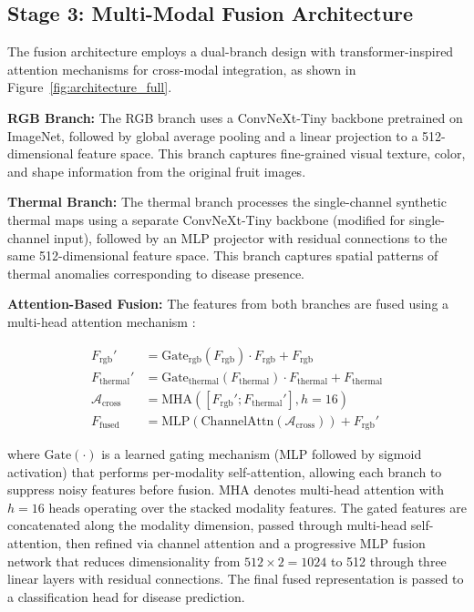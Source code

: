 \documentclass[utf8]{FrontiersinHarvard}
\newenvironment{revblock}{}{}
\begin{document}
\subsection{Stage 3: Multi-Modal Fusion Architecture}
\begin{revblock}
The fusion architecture employs a dual-branch design with transformer-inspired attention mechanisms for cross-modal integration, as shown in Figure~\ref{fig:architecture_full}.

\textbf{RGB Branch:} The RGB branch uses a ConvNeXt-Tiny \cite{liu2022convnext} backbone pretrained on ImageNet, followed by global average pooling and a linear projection to a 512-dimensional feature space. This branch captures fine-grained visual texture, color, and shape information from the original fruit images.

\textbf{Thermal Branch:} The thermal branch processes the single-channel synthetic thermal maps using a separate ConvNeXt-Tiny backbone \cite{liu2022convnext} (modified for single-channel input), followed by an MLP projector with residual connections to the same 512-dimensional feature space. This branch captures spatial patterns of thermal anomalies corresponding to disease presence.

\textbf{Attention-Based Fusion:} The features from both branches are fused using a multi-head attention mechanism \cite{vaswani2017,guo2022}:

\begin{align}
    F_{\text{rgb}}' &= \text{Gate}_{\text{rgb}}(F_{\text{rgb}}) \cdot F_{\text{rgb}} + F_{\text{rgb}} \label{eq:gate_rgb} \\
    F_{\text{thermal}}' &= \text{Gate}_{\text{thermal}}(F_{\text{thermal}}) \cdot F_{\text{thermal}} + F_{\text{thermal}} \label{eq:gate_thermal} \\
    \mathcal{A}_{\text{cross}} &= \text{MHA}([F_{\text{rgb}}'; F_{\text{thermal}}'], h{=}16) \label{eq:mha} \\
    F_{\text{fused}} &= \text{MLP}(\text{ChannelAttn}(\mathcal{A}_{\text{cross}})) + F_{\text{rgb}}' \label{eq:fused}
\end{align}

where $\text{Gate}(\cdot)$ is a learned gating mechanism (MLP followed by sigmoid activation) that performs per-modality self-attention, allowing each branch to suppress noisy features before fusion. MHA denotes multi-head attention with $h=16$ heads operating over the stacked modality features. The gated features are concatenated along the modality dimension, passed through multi-head self-attention, then refined via channel attention and a progressive MLP fusion network that reduces dimensionality from $512 \times 2 = 1024$ to 512 through three linear layers with residual connections. The final fused representation is passed to a classification head for disease prediction.


\end{revblock}
\end{document}
